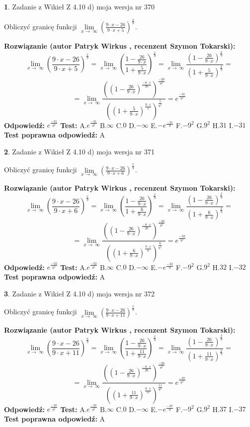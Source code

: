 \documentclass[12pt, a4paper]{article}
\theoremstyle{definition} %
\newtheorem{zad}{}
\newcommand{\zadStart}[1]{\begin{zad}#1\newline}
\newcommand{\zadStop}{\end{zad}}
\newcommand{\rozwStart}[2]{\noindent \textbf{Rozwiązanie (autor #1 , recenzent #2): }\newline}
\newcommand{\rozwStop}{\newline}
\newcommand{\odpStart}{\noindent \textbf{Odpowiedź:}\newline}
\newcommand{\odpStop}{\newline}
\newcommand{\testStart}{\noindent \textbf{Test:}\newline}
\newcommand{\testStop}{\newline}
\newcommand{\kluczStart}{\noindent \textbf{Test poprawna odpowiedź:}\newline}
\newcommand{\kluczStop}{\newline}
\begin{document}
\zadStart{Zadanie z Wikieł Z 4.10 d) moja wersja nr 370}


Obliczyć granicę funkcji  $\lim\limits_{x\to\ \infty}(\frac{9\cdot x-26}{9\cdot x+5})^{\frac{x}{9}}$.
\zadStop
\rozwStart{Patryk Wirkus}{Szymon Tokarski}
$$\lim\limits_{x\to\ \infty}(\frac{9\cdot x-26}{9\cdot x+5})^{\frac{x}{9}} = \lim\limits_{x\to\ \infty}(\frac{1-\frac{26}{9\cdot x}}{1+\frac{5}{9\cdot x}})^{\frac{x}{9}}=\lim\limits_{x\to\ \infty}\frac{(1-\frac{26}{9\cdot x})^{\frac{x}{9}}}{(1+\frac{5}{9\cdot x})^{\frac{x}{9}}}=$$
$$=\lim\limits_{x\to\ \infty}\frac{((1-\frac{26}{9\cdot x})^{\frac{-9\cdot x}{26}})^{\frac{-26}{9^{2}}}}{((1+\frac{5}{9\cdot x})^{\frac{9\cdot x}{5}})^{\frac{5}{9^{2}}}}=e^{\frac{-31}{9^{2}}}$$
\rozwStop
\odpStart
$e^{\frac{-31}{9^{2}}}$
\odpStop
\testStart
A.$e^{\frac{-31}{9^{2}}}$ B.$\infty$ C.$0$ D.$-\infty$ E.$-e^{\frac{-31}{9}}$
F.$-9^{2}$ G.$9^{2}$
H.$31$
I.$-31$
\testStop
\kluczStart
A
\kluczStop



\zadStart{Zadanie z Wikieł Z 4.10 d) moja wersja nr 371}


Obliczyć granicę funkcji  $\lim\limits_{x\to\ \infty}(\frac{9\cdot x-26}{9\cdot x+6})^{\frac{x}{9}}$.
\zadStop
\rozwStart{Patryk Wirkus}{Szymon Tokarski}
$$\lim\limits_{x\to\ \infty}(\frac{9\cdot x-26}{9\cdot x+6})^{\frac{x}{9}} = \lim\limits_{x\to\ \infty}(\frac{1-\frac{26}{9\cdot x}}{1+\frac{6}{9\cdot x}})^{\frac{x}{9}}=\lim\limits_{x\to\ \infty}\frac{(1-\frac{26}{9\cdot x})^{\frac{x}{9}}}{(1+\frac{6}{9\cdot x})^{\frac{x}{9}}}=$$
$$=\lim\limits_{x\to\ \infty}\frac{((1-\frac{26}{9\cdot x})^{\frac{-9\cdot x}{26}})^{\frac{-26}{9^{2}}}}{((1+\frac{6}{9\cdot x})^{\frac{9\cdot x}{6}})^{\frac{6}{9^{2}}}}=e^{\frac{-32}{9^{2}}}$$
\rozwStop
\odpStart
$e^{\frac{-32}{9^{2}}}$
\odpStop
\testStart
A.$e^{\frac{-32}{9^{2}}}$ B.$\infty$ C.$0$ D.$-\infty$ E.$-e^{\frac{-32}{9}}$
F.$-9^{2}$ G.$9^{2}$
H.$32$
I.$-32$
\testStop
\kluczStart
A
\kluczStop



\zadStart{Zadanie z Wikieł Z 4.10 d) moja wersja nr 372}


Obliczyć granicę funkcji  $\lim\limits_{x\to\ \infty}(\frac{9\cdot x-26}{9\cdot x+11})^{\frac{x}{9}}$.
\zadStop
\rozwStart{Patryk Wirkus}{Szymon Tokarski}
$$\lim\limits_{x\to\ \infty}(\frac{9\cdot x-26}{9\cdot x+11})^{\frac{x}{9}} = \lim\limits_{x\to\ \infty}(\frac{1-\frac{26}{9\cdot x}}{1+\frac{11}{9\cdot x}})^{\frac{x}{9}}=\lim\limits_{x\to\ \infty}\frac{(1-\frac{26}{9\cdot x})^{\frac{x}{9}}}{(1+\frac{11}{9\cdot x})^{\frac{x}{9}}}=$$
$$=\lim\limits_{x\to\ \infty}\frac{((1-\frac{26}{9\cdot x})^{\frac{-9\cdot x}{26}})^{\frac{-26}{9^{2}}}}{((1+\frac{11}{9\cdot x})^{\frac{9\cdot x}{11}})^{\frac{11}{9^{2}}}}=e^{\frac{-37}{9^{2}}}$$
\rozwStop
\odpStart
$e^{\frac{-37}{9^{2}}}$
\odpStop
\testStart
A.$e^{\frac{-37}{9^{2}}}$ B.$\infty$ C.$0$ D.$-\infty$ E.$-e^{\frac{-37}{9}}$
F.$-9^{2}$ G.$9^{2}$
H.$37$
I.$-37$
\testStop
\kluczStart
A
\kluczStop
\end{document}
